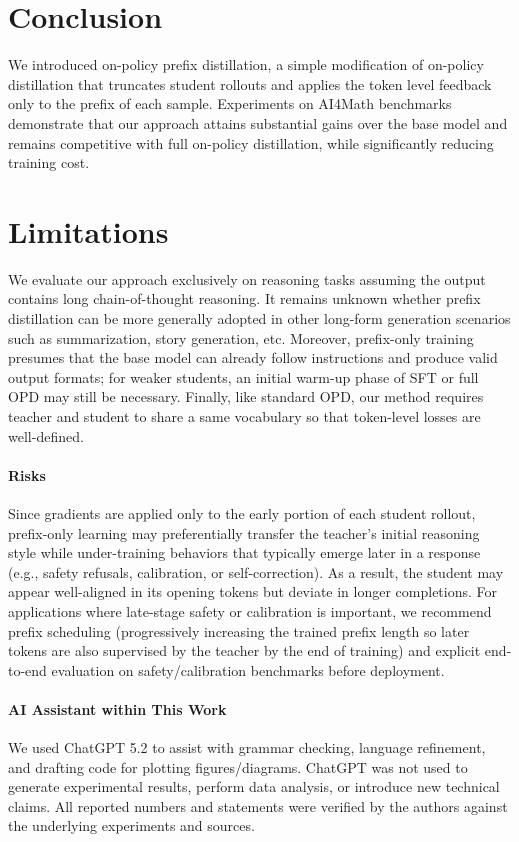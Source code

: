 \documentclass[11pt]{article}
\begin{document}
\section{Conclusion}  

  
We introduced on-policy prefix distillation, a simple modification of on-policy distillation that truncates student rollouts and applies the token level feedback only to the prefix of each sample. Experiments on AI4Math benchmarks demonstrate that our approach attains substantial gains over the base model and remains competitive with full on-policy distillation, while significantly reducing training cost.

\section{Limitations}  
  
We evaluate our approach exclusively on reasoning tasks assuming the output contains long chain-of-thought reasoning. It remains unknown whether prefix distillation can be more generally adopted in other long-form generation scenarios such as summarization, story generation, etc.
Moreover, prefix-only training presumes that the base model can already follow instructions and produce valid output formats; for weaker students, an initial warm-up phase of SFT or full OPD may still be necessary.    
Finally, like standard OPD, our method requires teacher and student to share a same vocabulary so that token-level losses are well-defined. 

\paragraph{Risks}
Since gradients are applied only to the early portion of each student rollout, prefix-only learning may preferentially transfer the teacher’s initial reasoning style while under-training behaviors that typically emerge later in a response (e.g., safety refusals, calibration, or self-correction). As a result, the student may appear well-aligned in its opening tokens but deviate in longer completions. For applications where late-stage safety or calibration is important, we recommend prefix scheduling (progressively increasing the trained prefix length so later tokens are also supervised by the teacher by the end of training) and explicit end-to-end evaluation on safety/calibration benchmarks before deployment.

\paragraph{AI Assistant within This Work}  
We used ChatGPT 5.2 to assist with grammar checking, language refinement, and drafting code for plotting figures/diagrams. ChatGPT was not used to generate experimental results, perform data analysis, or introduce new technical claims. All reported numbers and statements were verified by the authors against the underlying experiments and sources.  
\end{document}
